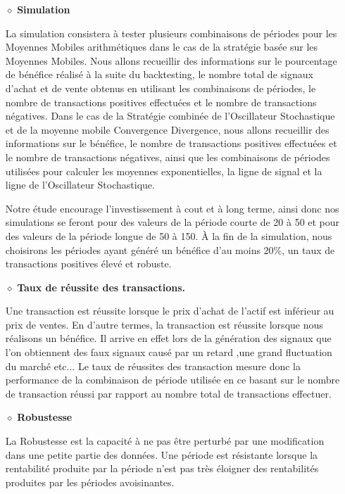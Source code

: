 \begin{itemize}
	\item[$\diamond$]\textbf{Simulation}
	\par{La simulation consistera à tester plusieurs combinaisons de périodes pour les Moyennes Mobiles 
    arithmétiques dans le cas de la stratégie basée sur les Moyennes Mobiles. Nous allons recueillir des
    informations sur le pourcentage de bénéfice réalisé à la suite du backtesting, 
    le nombre total de signaux d'achat et de vente obtenus
    en utilisant les combinaisons de périodes, le nombre de transactions positives effectuées et le nombre de transactions 
    négatives. Dans le cas de la Stratégie combinée de l'Oscillateur Stochastique et de la moyenne mobile Convergence Divergence, 
    nous allons recueillir des informations sur le bénéfice, le nombre de transactions positives effectuées et le 
    nombre de transactions négatives, ainsi que les combinaisons de périodes utilisées pour calculer les moyennes exponentielles, la ligne de signal et la ligne de l'Oscillateur Stochastique.

    Notre étude encourage l'investissement à cout et à long terme, ainsi donc nos simulations se 
    feront pour des valeurs de la période courte de 20 à 50 et pour des valeurs de la période longue de 50 à 150.
    À la fin de la simulation, nous choisirons les périodes ayant généré un bénéfice d'au moins 20\%, 
    un taux de transactions positives élevé et robuste.


 }


	\item[$\diamond$]\textbf{Taux de réussite des transactions.}
	\par{Une transaction est réussite lorsque le prix d'achat de l'actif est inférieur au prix de ventes.
    En d'autre termes, la transaction est réussite lorsque nous réalisons un bénéfice.
    Il arrive en effet lors de la génération des signaux que l'on obtiennent des faux signaux causé par un retard
    ,une grand fluctuation du marché etc... 
    Le taux de réussites des transaction mesure donc la performance de la combinaison de 
    période utilisée en ce basant sur le nombre de transaction réussi par rapport au nombre total de transactions
    effectuer.
    

}

	\item[$\diamond$]\textbf{Robustesse }
	\par{La Robustesse est la capacité à ne pas être perturbé par une modification dans une petite
    partie des données. Une période est résistante lorsque la rentabilité produite par la période
    n'est pas très éloigner des rentabilités produites par les périodes avoisinantes.}



\end{itemize}


